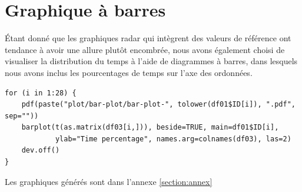 \documentclass[11pt]{article}
\begin{document}
\section{Graphique à barres}
Étant donné que les graphiques radar qui intègrent des valeurs de référence ont
tendance à avoir une allure plutôt encombrée, nous avons également choisi de
visualiser la distribution du temps à l'aide de diagrammes à barres, dans
lesquels nous avons inclus les pourcentages de temps sur l'axe des ordonnées.
\begin{verbatim}
for (i in 1:28) {
    pdf(paste("plot/bar-plot/bar-plot-", tolower(df01$ID[i]), ".pdf", sep=""))
    barplot(t(as.matrix(df03[i,])), beside=TRUE, main=df01$ID[i],
            ylab="Time percentage", names.arg=colnames(df03), las=2)
    dev.off()
}
\end{verbatim}
Les graphiques générés sont dans l'annexe \ref{section:annex}
\end{document}

